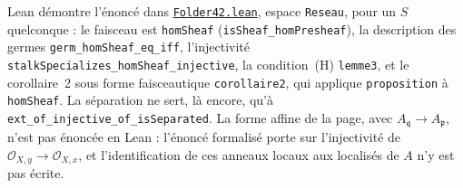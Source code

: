 \begin{remarque}
Lean démontre l'énoncé dans \href{\leanblob/Topology/Folder42.lean}{\texttt{Folder42.\allowbreak{}lean}}, espace \texttt{Reseau}, pour un $S$ quelconque : le faisceau est \texttt{homSheaf} (\texttt{isSheaf\_homPresheaf}), la description des germes \texttt{germ\_homSheaf\_eq\_iff}, l'injectivité \texttt{stalkSpecializes\_homSheaf\_injective}, la condition~(H) \texttt{lemme3}, et le corollaire~2 sous forme faisceautique \texttt{corollaire2}, qui applique \texttt{proposition} à \texttt{homSheaf}. La séparation ne sert, là encore, qu'à \texttt{ext\_of\_injective\_of\_isSeparated}. La forme affine de la page, avec $A_{\mathfrak q} \to A_{\mathfrak p}$, n'est pas énoncée en Lean : l'énoncé formalisé porte sur l'injectivité de $\mathcal O_{X,y} \to \mathcal O_{X,x}$, et l'identification de ces anneaux locaux aux localisés de $A$ n'y est pas écrite.
\end{remarque}
